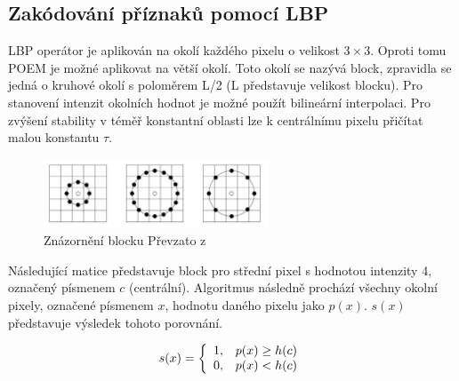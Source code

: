 \documentclass{report}
\begin{document}
\subsection{Zakódování příznaků pomocí LBP}
LBP operátor je aplikován na okolí každého pixelu o velikost $3 \times 3$. Oproti tomu POEM je možné aplikovat na větší okolí. Toto okolí se nazývá block, zpravidla se jedná o kruhové okolí s poloměrem L/2 (L představuje velikost blocku). Pro stanovení intenzit okolních hodnot je možné použít bilineární interpolaci. Pro zvýšení stability v téměř konstantní oblasti lze k centrálnímu pixelu přičítat malou konstantu $\tau$. 

\begin{figure}[H]
		\centering
		\includegraphics[width=253px]{./img/znazorneni_lbp.png}	
		\caption{Znázornění blocku Převzato z \cite{SrovnaniDeskriptoru}}
\end{figure}

Následující matice představuje block pro střední pixel s hodnotou intenzity 4, označený písmenem $c$ (centrální). Algoritmus následně prochází všechny okolní pixely, označené písmenem  $x$, hodnotu daného pixelu jako $p(x)$. $s(x)$ představuje výsledek tohoto porovnání.

\begin{displaymath} 
	\label{asd2} 
		    s(x) = \left\{ \begin{array}{r@{\quad}c}
    		1, & p(x) \geq h(c) \\
    		0, & p(x) < h(c) \\ \end{array} \right. 
\end{displaymath}
\end{document}
